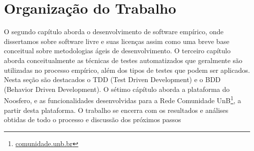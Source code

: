 	\section{Organização do Trabalho}
	
	
	O segundo capítulo aborda o desenvolvimento de software empírico, onde dissertamos sobre software livre 
	e suas licenças assim como uma breve base conceitual sobre metodologias ágeis de desenvolvimento.
	O terceiro capítulo aborda conceitualmente as técnicas de testes automatizados que geralmente
	são utilizadas no processo empírico, além dos tipos de testes que podem ser aplicados. Nesta seção são 
	destacados o TDD (Test Driven Development) e o BDD (Behavior Driven Development).
	O sétimo cápítulo aborda a plataforma do Noosfero, e as funcionalidades desenvolvidas para a Rede Comunidade UnB\footnote{\url{comunidade.unb.br}}, a partir desta plataforma.
	O trabalho se encerra com os resultados e análises obtidas de todo o processo e discussão dos próximos passos


